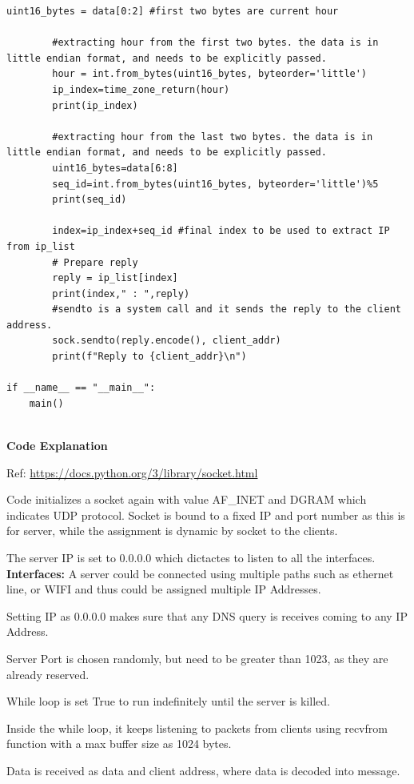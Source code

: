 \documentclass[12pt, a4paper]{report}
\begin{document}
\begin{lstlisting}[caption={}]
        uint16_bytes = data[0:2] #first two bytes are current hour
        
        #extracting hour from the first two bytes. the data is in little endian format, and needs to be explicitly passed.
        hour = int.from_bytes(uint16_bytes, byteorder='little')
        ip_index=time_zone_return(hour)
        print(ip_index)

        #extracting hour from the last two bytes. the data is in little endian format, and needs to be explicitly passed.
        uint16_bytes=data[6:8]
        seq_id=int.from_bytes(uint16_bytes, byteorder='little')%5
        print(seq_id)   
        
        index=ip_index+seq_id #final index to be used to extract IP from ip_list
        # Prepare reply 
        reply = ip_list[index]
        print(index," : ",reply)
        #sendto is a system call and it sends the reply to the client address.
        sock.sendto(reply.encode(), client_addr)
        print(f"Reply to {client_addr}\n")

if __name__ == "__main__":
    main()
    
\end{lstlisting}

\textbf{Code Explanation}

Ref: \noindent\href{https://docs.python.org/3/library/socket.html}{https://docs.python.org/3/library/socket.html}

Code initializes a socket again with value AF\_INET and DGRAM which indicates UDP protocol.
Socket is bound to a fixed IP and port number as this is for server, while the assignment is dynamic by socket to the clients.

The server IP is set to 0.0.0.0 which dictactes to listen to all the interfaces. 
\textbf{Interfaces: } A server could be connected using multiple paths such as ethernet line, or WIFI and thus could be assigned multiple IP Addresses. 

Setting IP as 0.0.0.0 makes sure that any DNS query is receives coming to any IP Address.

Server Port is chosen randomly, but need to be greater than 1023, as they are already reserved.

While loop is set True to run indefinitely until the server is killed.

Inside the while loop, it keeps listening to packets from clients using recvfrom function with a max buffer size as 1024 bytes.

Data is received as data and client address, where data is decoded into message.
\end{document}
